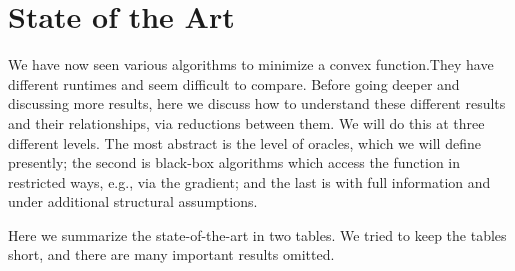 %

\section{State of the Art}

We have now seen various algorithms to minimize a convex function.They
have different runtimes and seem difficult to compare. Before going
deeper and discussing more results, here we discuss how to understand
these different results and their relationships, via reductions between
them. We will do this at three different levels. The most abstract
is the level of oracles, which we will define presently; the second
is black-box algorithms which access the function in restricted ways,
e.g., via the gradient; and the last is with full information and
under additional structural assumptions.

Here we summarize the state-of-the-art in two tables. We tried to
keep the tables short, and there are many important results omitted.

